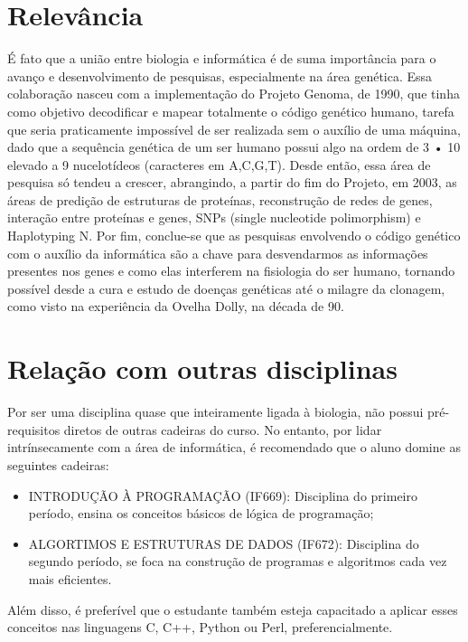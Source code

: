 \documentclass{article}
\begin{document}
\section{Relevância}
É fato que a união entre biologia e informática é de suma importância para o avanço e desenvolvimento de pesquisas, especialmente na área genética. Essa colaboração nasceu com a implementação do Projeto Genoma, de 1990, que tinha como objetivo decodificar e mapear totalmente o código genético humano, tarefa que seria praticamente impossível de ser realizada sem o auxílio de uma máquina, dado que a sequência genética de um ser humano possui algo na ordem de 3 • 10 elevado a 9 nucelotídeos (caracteres em {A,C,G,T}). Desde então, essa área de pesquisa só tendeu a crescer, abrangindo, a partir do fim do Projeto, em 2003, as áreas de predição de estruturas de proteínas, reconstrução de redes de genes, interação entre proteínas e genes, SNPs (single nucleotide polimorphism) e Haplotyping N. Por fim, conclue-se que as pesquisas envolvendo o código genético com o auxílio da informática são a chave para desvendarmos as informações presentes nos genes e como elas interferem na fisiologia do ser humano, tornando possível desde a cura e estudo de doenças genéticas até o milagre da clonagem, como visto na experiência da Ovelha Dolly, na década de 90. \cite{Relevancia}

\section{Relação com outras disciplinas}
Por ser uma disciplina quase que inteiramente ligada à biologia, não possui pré-requisitos diretos de outras cadeiras do curso. No entanto, por lidar intrínsecamente com a área de informática, é recomendado que o aluno domine as seguintes cadeiras:
\begin{itemize}
\item INTRODUÇÃO À PROGRAMAÇÃO (IF669): Disciplina do primeiro período, ensina os conceitos básicos de lógica de programação;
\end{itemize}
\begin{itemize}
\item ALGORTIMOS E ESTRUTURAS DE DADOS (IF672): Disciplina do segundo período, se foca na construção de programas e algoritmos cada vez mais eficientes.
\end{itemize}
Além disso, é preferível que o estudante também esteja capacitado a aplicar esses conceitos nas linguagens C, C++, Python ou Perl, preferencialmente. \cite{Relacao} 


\end{document}
